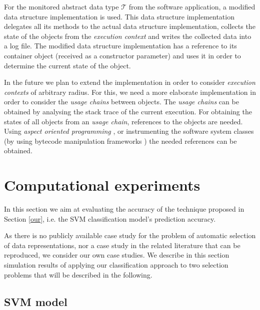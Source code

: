 For the monitored abstract data type $\mathcal{T}$ from the software application, a modified data structure implementation is used. This data structure implementation delegates all its methods to the actual data structure implementation, collects the state of the objects from the \emph{execution context} and writes the collected data into a log file. The modified data structure implementation has a reference to its container object (received as a constructor parameter) and uses it in order to determine the current state of the object.  

In the future we plan to extend the implementation in order to consider \emph{execution contexts} of arbitrary radius. For this, we need a more elaborate implementation in order to consider the \emph{usage chains} between objects. The \emph{usage chains} can be obtained by analysing the stack trace of the current execution. For obtaining the states of all objects from an \emph{usage chain}, references to the objects are needed. Using \emph{aspect oriented programming} \cite{kiczales97}, or instrumenting the software system classes (by using bytecode manipulation frameworks \cite{asm}) the needed references can be obtained.  

\section{Computational experiments} \label{compexp}

In this section we aim at evaluating the accuracy of the technique proposed in Section \ref{our}, i.e. the SVM classification model's prediction accuracy.

As there is no publicly available case study for the problem of automatic selection of data representations, nor a case study in the related literature that can be reproduced, we consider our own case studies. We describe in this section simulation results of applying
our classification approach to two selection problems that will be described in the following.

\subsection{SVM model}

